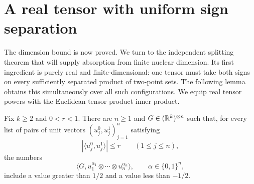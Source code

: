 \section{A real tensor with uniform sign separation}
\label{sec:gaussian}
The dimension bound is now proved. We turn to the independent
splitting theorem that will supply absorption from finite nuclear
dimension. Its first ingredient is purely real and finite-dimensional:
one tensor must take both signs on every sufficiently separated product
of two-point sets. The following lemma obtains this simultaneously over
all such configurations. We equip real tensor powers with the Euclidean
tensor product inner product.

\begin{lemma}\label{lem:gaussian}
Fix \(k\geq2\) and \(0<r<1\). There are \(n\geq1\) and \(G\in(\mathbb R^k)^{\otimes n}\) such that, for every list of pairs of unit vectors \((u_j^0,u_j^1)_{j=1}^n\) satisfying
\[
 |\langle u_j^0,u_j^1\rangle|\leq r\qquad(1\leq j\leq n),
\]
the numbers
\[
 \big\langle G,u_1^{\alpha_1}\otimes\cdots\otimes u_n^{\alpha_n}\big\rangle,
 \qquad \alpha\in\{0,1\}^n,
\]
include a value greater than \(1/2\) and a value less than \(-1/2\).
\end{lemma}
